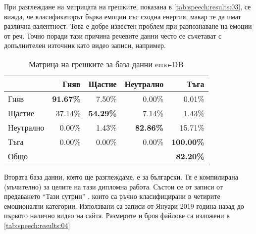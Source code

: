 \documentclass[main.tex]{subfiles}
\begin{document}
При разглеждане на матрицата на грешките, показана в \autoref{tab:speech:results:03}, се вижда, че класификаторът
бърка емоции със сходна енергия, макар те да имат различна валентност. Това е добре известен проблем при разпознаване на емоции от реч. Точно поради тази причина речевите данни често се съчетават с допълнителен източник като видео записи, например. 

\begin{table}[h]
    \begin{center}
    \begin{tabular}{|l|r r r r|} 
        \hline
        & Гняв & Щастие & Неутрално & Тъга \\ 
        \hline
        Гняв &  \textbf{91.67\%} & 7.50\% & 0.00\% & 0.01\% \\ 
        Щастие & 37.14\% & \textbf{54.29\%} & 7.14\% & 1.43\% \\ 
        Неутрално & 0.00\% & 1.43\% & \textbf{82.86\%} & 15.71\% \\ 
        Тъга & 0.00\% & 0.00\% & 0.00\% & \textbf{100.00\%}\\ 
        \hline
        \hline
        Общо & & & & \textbf{82.20\%}\\
        \hline
    \end{tabular}
    \caption{Матрица на грешките за база данни emo-DB}
    \label{tab:speech:results:03}
    \end{center}
\end{table}

Втората база данни, която ще разглеждаме, е за български. Тя е компилирана (мъчително) за целите на тази дипломна работа. Състои се от записи от предаването ``Тази сутрин'' \cite{tazi-sutrin}, които са ръчно класифицирани в четирите емоционални категории. Използвани са записи от Януари 2019 година назад до първото налично видео на сайта. Размерите и броя файлове са изложени в \autoref{tab:speech:results:04}
\end{document}
